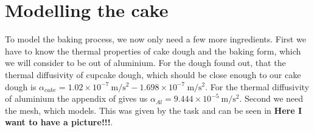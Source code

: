 
\section{\label{sec::modelling}Modelling the cake}
To model the baking process, we now only need a few more ingredients. First we have to know the thermal properties of cake dough and the baking form, which we will consider to be out of aluminium. For the dough \cite{baik1999modeling} found out, that the thermal diffusivity of cupcake dough, which should be close enough to our cake dough is $\alpha_{cake} =  1.02\times 10^{-7} \SI{}{\meter/\second^2} - 1.698\times 10^{-7} \SI{}{\meter/\second^2}$. For the thermal diffusivity of aluminium the appendix of \cite{kothandaraman2006fundamentals} gives us $\alpha_{Al} = 9.444\times 10^{-5} \SI{}{\meter/\second^2}$. Second we need the mesh, which models. This was given by the task and can be seen in \textbf{Here I want to have a picture!!!}. 